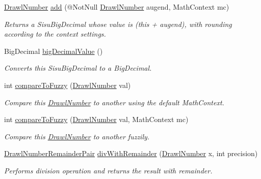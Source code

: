 \begin{DoxyCompactItemize}
\hyperlink{classcom_1_1aarrelaakso_1_1drawl_1_1_drawl_number}{Drawl\+Number} \hyperlink{classcom_1_1aarrelaakso_1_1drawl_1_1_drawl_number_a662ec93df5afeaa42ce9aee206625338}{add} (@Not\+Null \hyperlink{classcom_1_1aarrelaakso_1_1drawl_1_1_drawl_number}{Drawl\+Number} augend, Math\+Context mc)
\begin{DoxyCompactList}\small\item\em Returns a Sisu\+Big\+Decimal whose value is (this + augend), with rounding according to the context settings. \end{DoxyCompactList}\item 
Big\+Decimal \hyperlink{classcom_1_1aarrelaakso_1_1drawl_1_1_drawl_number_acf97abc572acd173a4d8cd6c5b5c2ecd}{big\+Decimal\+Value} ()
\begin{DoxyCompactList}\small\item\em Converts this Sisu\+Big\+Decimal to a Big\+Decimal. \end{DoxyCompactList}\item 
int \hyperlink{classcom_1_1aarrelaakso_1_1drawl_1_1_drawl_number_a3919eb2219b8e91e526f0f8b16cae162}{compare\+To\+Fuzzy} (\hyperlink{classcom_1_1aarrelaakso_1_1drawl_1_1_drawl_number}{Drawl\+Number} val)
\begin{DoxyCompactList}\small\item\em Compare this \hyperlink{classcom_1_1aarrelaakso_1_1drawl_1_1_drawl_number}{Drawl\+Number} to another using the default Math\+Context. \end{DoxyCompactList}\item 
int \hyperlink{classcom_1_1aarrelaakso_1_1drawl_1_1_drawl_number_ad2df3badb1fc05c8de18403a44835c98}{compare\+To\+Fuzzy} (\hyperlink{classcom_1_1aarrelaakso_1_1drawl_1_1_drawl_number}{Drawl\+Number} val, Math\+Context mc)
\begin{DoxyCompactList}\small\item\em Compare this \hyperlink{classcom_1_1aarrelaakso_1_1drawl_1_1_drawl_number}{Drawl\+Number} to another fuzzily. \end{DoxyCompactList}\item 
\hyperlink{classcom_1_1aarrelaakso_1_1drawl_1_1_drawl_number_remainder_pair}{Drawl\+Number\+Remainder\+Pair} \hyperlink{classcom_1_1aarrelaakso_1_1drawl_1_1_drawl_number_ab25fcdd87cf4bf6bc5906526940b4ac3}{div\+With\+Remainder} (\hyperlink{classcom_1_1aarrelaakso_1_1drawl_1_1_drawl_number}{Drawl\+Number} x, int precision)
\begin{DoxyCompactList}\small\item\em Performs division operation and returns the result with remainder. \end{DoxyCompactList}\item 

\end{DoxyCompactItemize}
